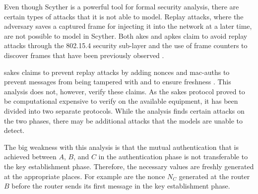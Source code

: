 Even though Scyther is a powerful tool for formal security analysis, there are certain types of attacks that it is not able to model. Replay attacks, where the adversary saves a captured frame for injecting it into the network at a later time, are not possible to model in Scyther. Both \gls{akes} and \gls{apkes} claim to avoid replay attacks through the 802.15.4 security sub-layer and the use of frame counters to discover frames that have been previously observed \cite{krentz2015handling, krentz20136lowpan}.

\gls{sakes} claims to prevent replay attacks by adding nonces and \gls{mac-auth}s to prevent messages from being tampered with and to ensure freshness \cite{hussen2013sakes}. This analysis does not, however, verify these claims. As the \gls{sakes} protocol proved to be computational expensive to verify on the available equipment, it has been divided into two separate protocols. While the analysis finds certain attacks on the two phases, there may be additional attacks that the models are unable to detect.

The big weakness with this analysis is that the mutual authentication that is achieved between $A$, $B$, and $C$ in the authentication phase is not transferable to the key establishment phase. Therefore, the necessary values are freshly generated at the appropriate places. For example are the nonce $N_C$ generated at the router $B$ before the router sends its first message in the key establishment phase.  













